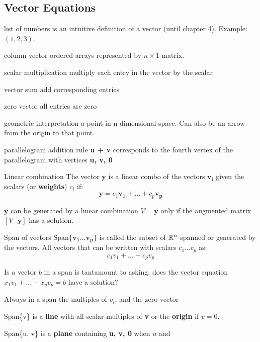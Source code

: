 \begin{card}
    \subsection{Vector Equations}

    \begin{compactdesc}
    \item[list of numbers] is an intuitive definition of a vector
        (until chapter 4). Example: $(1,2,3)$.
    \item[column vector] ordered arrays represented by $n\times1$ matrix.
    \item[scalar multiplication] multiply each entry in the vector by the scalar
    \item[vector sum] add corresponding entries
    \item[zero vector] all entries are zero
    \item[geometric interpretation] a point in n-dimensional space. Can also
        be an arrow from the origin to that point.
    \item[parallelogram addition rule] \textbf{u + v} corresponds to the
        fourth vertex of the parallelogram with vertices \textbf{u, v, 0}
    \item[Linear combination] The vector $\bm{y}$ is a linear combo of the
        vectors $\bm{v_i}$ given the scalars (or \textbf{weights}) $c_i$ if:
        \[
            \bm{y} = c_1 \bm{v_1} + \dots + c_p \bm{v_p}
        \]
    \item[$\bm{y}$ can be generated] by a linear combination $V = \bm{y}$ only
        if the augmented matrix $[V \text{ } \bm{y}]$ has a solution.
    \item[Span] of vectors $\text{Span}\{ \bm{v_1} \dots \bm{v_p} \}$ is
        called the subset of $\mathbb{R}^n$ spanned or generated by the
        vectors. All vectors that can be written with scalars $c_1 \dots c_p$
        as:
        \[
            c_1 v_1 + \dots + c_p v_p
        \]
    \item[Is a vector $b$ in a span] is tantamount to asking: does the
        vector equation $x_1 v_1 + \dots + x_p v_p = b$ have a solution?
    \item[Always in a span] the multiples of $v_i$, and the zero vector
    \item[Span\{v\}] is a \textbf{line} with all scalar multiples of \textbf{v}
        or the \textbf{origin} if $v = 0$.
    \item[Span\{u, v\}] is a \textbf{plane} containing \textbf{u, v, 0} when $u$ and

\end{compactdesc}
\end{card}
